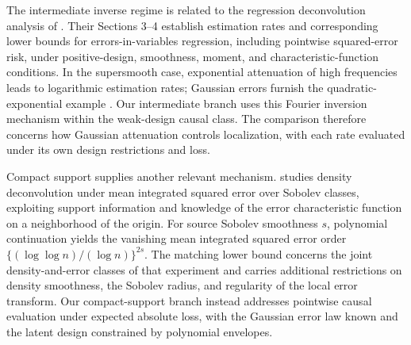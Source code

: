 The intermediate inverse regime is related to the regression deconvolution analysis of \citet{FanTruong1993}. Their Sections 3--4 establish estimation rates and corresponding lower bounds for errors-in-variables regression, including pointwise squared-error risk, under positive-design, smoothness, moment, and characteristic-function conditions. In the supersmooth case, exponential attenuation of high frequencies leads to logarithmic estimation rates; Gaussian errors furnish the quadratic-exponential example \citep[Sections 3--4]{FanTruong1993}. Our intermediate branch uses this Fourier inversion mechanism within the weak-design causal class. The comparison therefore concerns how Gaussian attenuation controls localization, with each rate evaluated under its own design restrictions and loss.

Compact support supplies another relevant mechanism. \citet[Theorems 1--2]{Meister2007} studies density deconvolution under mean integrated squared error over Sobolev classes, exploiting support information and knowledge of the error characteristic function on a neighborhood of the origin. For source Sobolev smoothness \(s\), polynomial continuation yields the vanishing mean integrated squared error order \(\{(\log\log n)/(\log n)\}^{2s}\). The matching lower bound concerns the joint density-and-error classes of that experiment and carries additional restrictions on density smoothness, the Sobolev radius, and regularity of the local error transform. Our compact-support branch instead addresses pointwise causal evaluation under expected absolute loss, with the Gaussian error law known and the latent design constrained by polynomial envelopes.

